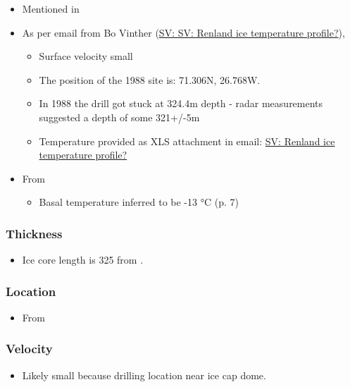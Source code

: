 \documentclass[article,a4paper,times,11pt,twoside]{article}
\begin{document}
\begin{itemize}
\item Mentioned in \textcite{vinther_2008}
\item As per email from Bo Vinther (\href{msgid:2033620922.1391238.1606871518421@titapp04}{SV: SV: Renland ice temperature profile?}),
\begin{itemize}
\item Surface velocity small
\item The position of the 1988 site is: 71.306N, 26.768W.
\item In 1988 the drill got stuck at 324.4m depth - radar measurements suggested a depth of some 321+/-5m \autocite{johnsen_1992}
\item Temperature provided as XLS attachment in email: \href{msgid:9d866df4f1bc4dd8aaa1216ad90406dc@nbi.ku.dk}{SV: Renland ice temperature profile?}
\end{itemize}
\item From \textcite{johnsen_1992}
\begin{itemize}
\item Basal temperature inferred to be -13 °C (p. 7)
\end{itemize}
\end{itemize}

\subsubsection{Thickness}
\label{sec:orgb499ed7}

\begin{itemize}
\item Ice core length is 325 from \textcite{vinther_2008}.
\end{itemize}

\subsubsection{Location}
\label{sec:org5e07da0}

\begin{itemize}
\item From \textcite{vinther_2008}
\end{itemize}

\subsubsection{Velocity}
\label{sec:org3fd72f1}

\begin{itemize}
\item Likely small because drilling location near ice cap dome.
\end{itemize}
\clearpage
\end{document}
